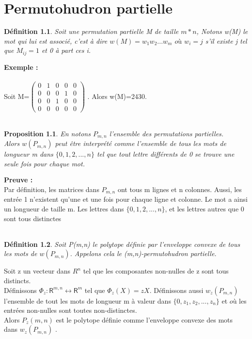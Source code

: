 \documentclass{book}
\newtheorem{petit_nom1}{Proposition}
\newtheorem{petit_nom2}{Définition}[chapter]
\begin{document}
\chapter{Permutohudron partielle}
\begin{petit_nom2}
Soit une permutation partielle M de taille $m*n$, Notons w(M) le mot qui lui est associé, c'est à dire $w(M)=w_1w_2...w_m$ $où$ $w_i=j$ s'il existe j tel que $M_{ij}=1$ et 0 à part ces i.
\end{petit_nom2}
\textbf{Exemple : }\\\\
Soit M=$\begin{pmatrix}
0&1&0&0&0\\0&0&0&1&0\\0&0&1&0&0\\0&0&0&0&0
\end{pmatrix} $ . Alors w(M)=2430.\\\\
\begin{petit_nom1}
En notons $P_{m,n}$ l'ensemble des permutations partielles. \\
Alors $w(P_{m,n})$ peut être interprété comme l'ensemble de tous les mots de longueur m dans $\{0,1,2,...,n \}$ tel que tout lettre différents de 0 se trouve une seule fois pour chaque mot.
\end{petit_nom1}
\textbf{Preuve : }\\
Par définition, les matrices dans $P_{m,n}$ ont tous m lignes et n colonnes. Aussi, les entrée 1 n'existent qu'une et une fois pour chaque ligne et colonne. Le mot a ainsi un longueur de taille m. Les lettres dans $\{0,1,2,...,n \}$, et les lettres autres que 0 sont tous distinctes \\\\
\begin{petit_nom2}
Soit P(m,n) le polytope définie par l'enveloppe convexe de tous les mots de $w(P_{m,n})$. Appelons cela le (m,n)-permutohudron partielle. 
\end{petit_nom2}
Soit z un vecteur dans $R^n$ tel que les composantes non-nulles de z sont tous distincts. \\
Définissons $\Phi_z : \mathsf{R}^{m,n} \longleftrightarrow \mathsf{R}^m $ tel que $\Phi_z (X) = zX $. Définissons aussi $w_z(P_{m,n})$ l'ensemble de tout les mots de longueur m à valeur dans $\{0,z_1,z_2,...,z_n \}$ et $où$ les entrées non-nulles sont toutes non-distinctes. \\ Alors $P_z(m,n)$ est le polytope définie comme l'enveloppe convexe des mots dans $w_z(P_{m,n})$ . \\\\
\end{document}
